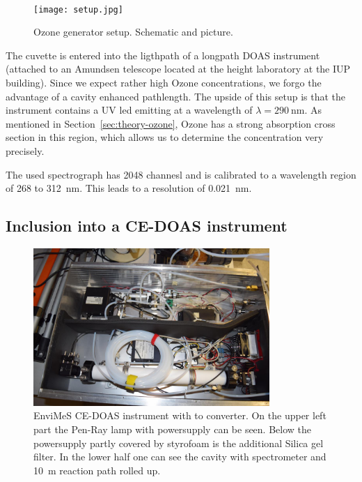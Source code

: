 \begin{figure}[htbp]
  \centering
  {
  \def\svgwidth{0.9\linewidth}
  
  }
  \phantom{h}\\
  \bigskip
  \texttt{[image: setup.jpg]}
  \caption{Ozone generator setup. Schematic and picture.}
  \label{fig:setup}
\end{figure}

The cuvette is entered into the ligthpath of a longpath DOAS
instrument (attached to an Amundsen telescope located at the height
laboratory at the IUP building). Since we expect rather high Ozone
concentrations, we forgo the advantage of a cavity enhanced
pathlength. The upside of this setup is that the instrument contains
a UV led emitting at a wavelength of $\lambda =
\SI{290}{\nano\meter}$. As mentioned in
Section~\ref{sec:theory-ozone}, Ozone has a strong absorption cross
section in this region, which allows us to determine the concentration
very precisely. 

The used spectrograph has 2048 channesl and is calibrated to a
wavelength region of \num{268} to \SI{312}{\nano\meter}. This leads to
a resolution of \SI{0.021}{\nano\meter}.

\subsection{Inclusion into a CE-DOAS instrument}
\label{sec:inclusion}

\begin{figure}[htbp]
  \centering
  \includegraphics[width=0.8\textwidth]{images/envimes_up.jpg}
  \caption{EnviMeS CE-DOAS instrument with  to 
    converter. On the upper left part the Pen-Ray lamp with
    powersupply can be seen. Below the powersupply partly covered by
    styrofoam is the additional Silica gel filter. In the lower half
    one can see the cavity with spectrometer and \SI{10}{\meter}
    reaction path rolled up.}
  \label{fig:envimes}
\end{figure}

